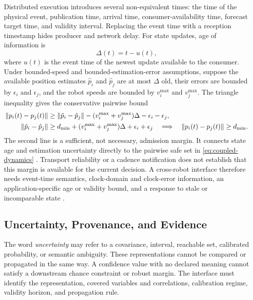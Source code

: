 Distributed execution introduces several non-equivalent times: the time of the
physical event, publication time, arrival time, consumer-availability time,
forecast target time, and validity interval.  Replacing the event time with a
reception timestamp hides producer and network delay.  For state updates, age of
information is
\begin{equation}
  \Delta(t)=t-u(t),
  \label{eq:aoi}
\end{equation}
where $u(t)$ is the event time of the newest update available to the consumer.
Under bounded-speed and bounded-estimation-error assumptions, suppose the
available position estimates $\hat p_i$ and $\hat p_j$ are at most $\Delta$ old,
their errors are bounded by $\epsilon_i$ and $\epsilon_j$, and the robot speeds
are bounded by $v_i^{\max}$ and $v_j^{\max}$.  The triangle inequality gives the
conservative pairwise bound
\begin{align}
  \lVert p_i(t)-p_j(t)\rVert
  &\ge \lVert\hat p_i-\hat p_j\rVert
     -(v_i^{\max}+v_j^{\max})\Delta-\epsilon_i-\epsilon_j,
     \notag\\
  \lVert\hat p_i-\hat p_j\rVert
  &\ge d_{\min}+(v_i^{\max}+v_j^{\max})\Delta
     +\epsilon_i+\epsilon_j
     \quad\Longrightarrow\quad
     \lVert p_i(t)-p_j(t)\rVert\ge d_{\min}.
  \label{eq:freshness-separation}
\end{align}
The second line is a sufficient, not necessary, admission margin.  It connects
state age and estimation uncertainty directly to the pairwise safe set in
\cref{eq:coupled-dynamics} \cite{kaul2012aoi,wang2017barrier}.  Transport
reliability or a cadence notification does not establish that this margin is
available for the current decision.  A cross-robot interface therefore needs
event-time semantics, clock-domain and clock-error information, an
application-specific age or validity bound, and a response to stale or
incomparable state \cite{omg2015dds,kronauer2021latency}.

\subsection{Uncertainty, Provenance, and Evidence}

The word \emph{uncertainty} may refer to a covariance, interval, reachable set,
calibrated probability, or semantic ambiguity.  These representations cannot be
compared or propagated in the same way.  A confidence value with no declared
meaning cannot satisfy a downstream chance constraint or robust margin.  The
interface must identify the representation, covered variables and correlations,
calibration regime, validity horizon, and propagation rule.


